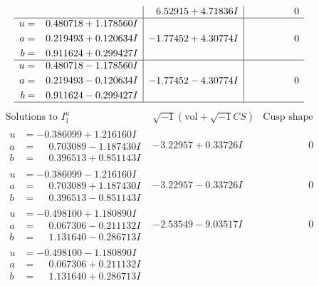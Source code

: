 \documentclass[1p]{elsarticle_modified}
\theoremstyle{definition}
\newcommand{\I}{\sqrt{-1}}
\begin{document}
$$\begin{array}{c|c|c}
 & \phantom{-}6.52915 + 4.71836 I & \phantom{-0.000000 } 0 \\ \hline\begin{aligned}
u &= \phantom{-}0.480718 + 1.178560 I \\
a &= \phantom{-}0.219493 + 0.120634 I \\
b &= \phantom{-}0.911624 + 0.299427 I\end{aligned}
 & -1.77452 + 4.30774 I & \phantom{-0.000000 } 0 \\ \hline\begin{aligned}
u &= \phantom{-}0.480718 - 1.178560 I \\
a &= \phantom{-}0.219493 - 0.120634 I \\
b &= \phantom{-}0.911624 - 0.299427 I\end{aligned}
 & -1.77452 - 4.30774 I & \phantom{-0.000000 } 0\\
 \hline 
 \end{array}$$\newpage$$\begin{array}{c|c|c}  
\text{Solutions to }I^u_{1}& \I (\text{vol} + \sqrt{-1}CS) & \text{Cusp shape}\\
 \hline 
\begin{aligned}
u &= -0.386099 + 1.216160 I \\
a &= \phantom{-}0.703089 - 1.187430 I \\
b &= \phantom{-}0.396513 + 0.851143 I\end{aligned}
 & -3.22957 + 0.33726 I & \phantom{-0.000000 } 0 \\ \hline\begin{aligned}
u &= -0.386099 - 1.216160 I \\
a &= \phantom{-}0.703089 + 1.187430 I \\
b &= \phantom{-}0.396513 - 0.851143 I\end{aligned}
 & -3.22957 - 0.33726 I & \phantom{-0.000000 } 0 \\ \hline\begin{aligned}
u &= -0.498100 + 1.180890 I \\
a &= \phantom{-}0.067306 - 0.211132 I \\
b &= \phantom{-}1.131640 - 0.286713 I\end{aligned}
 & -2.53549 - 9.03517 I & \phantom{-0.000000 } 0 \\ \hline\begin{aligned}
u &= -0.498100 - 1.180890 I \\
a &= \phantom{-}0.067306 + 0.211132 I \\
b &= \phantom{-}1.131640 + 0.286713 I\end{aligned}

\end{array}$$
\end{document}
